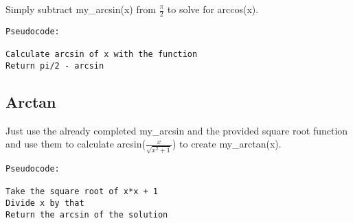 \documentclass[11pt]{article}
\begin{document}
Simply subtract my\_arcsin(x) from $\frac \pi 2$ to solve for arccos(x).

\begin{verbatim}
Pseudocode:

Calculate arcsin of x with the function
Return pi/2 - arcsin
\end{verbatim}

\subsection{Arctan}

Just use the already completed my\_arcsin and the provided square root function and use them to calculate arcsin($\frac x {\sqrt{x^2 + 1}}$) to create my\_arctan(x).

\begin{verbatim}
Pseudocode:

Take the square root of x*x + 1
Divide x by that
Return the arcsin of the solution
\end{verbatim}
\end{document}
